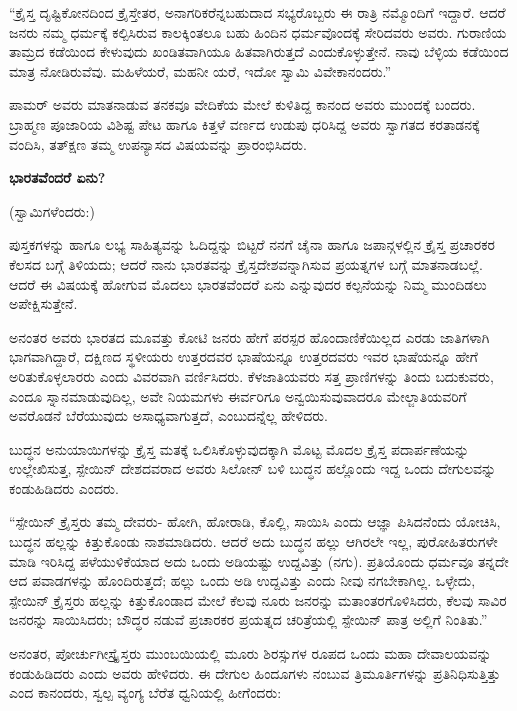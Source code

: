 “ಕ್ರೈಸ್ತ ದೃಷ್ಟಿಕೋನದಿಂದ ಕ್ರೈಸ್ತೇತರ, ಅನಾಗರಿಕರೆನ್ನಬಹುದಾದ ಸಭ್ಯರೊಬ್ಬರು ಈ ರಾತ್ರಿ ನಮ್ಮೊಂದಿಗೆ ಇದ್ದಾರೆ. ಆದರೆ ಜನರು ನಮ್ಮ ಧರ್ಮಕ್ಕೆ ಕಲ್ಪಿಸಿರುವ ಕಾಲಕ್ಕಿಂತಲೂ ಬಹು ಹಿಂದಿನ ಧರ್ಮವೊಂದಕ್ಕೆ ಸೇರಿದವರು ಅವರು. ಗುರಾಣಿಯ ತಾಮ್ರದ ಕಡೆಯಿಂದ ಕೇಳುವುದು ಖಂಡಿತವಾಗಿಯೂ ಹಿತವಾಗಿರುತ್ತದೆ ಎಂದುಕೊಳ್ಳುತ್ತೇನೆ. ನಾವು ಬೆಳ್ಳಿಯ ಕಡೆಯಿಂದ ಮಾತ್ರ ನೋಡಿರುವೆವು. ಮಹಿಳೆಯರೆ, ಮಹನೀ ಯರೆ, ಇದೋ ಸ್ವಾಮಿ ವಿವೇಕಾನಂದರು.”

ಪಾಮರ್ ಅವರು ಮಾತನಾಡುವ ತನಕವೂ ವೇದಿಕೆಯ ಮೇಲೆ ಕುಳಿತಿದ್ದ ಕಾನಂದ ಅವರು ಮುಂದಕ್ಕೆ ಬಂದರು. ಬ್ರಾಹ್ಮಣ ಪೂಜಾರಿಯ ವಿಶಿಷ್ಟ ಪೇಟ ಹಾಗೂ ಕಿತ್ತಳೆ ವರ್ಣದ ಉಡುಪು ಧರಿಸಿದ್ದ ಅವರು ಸ್ವಾಗತದ ಕರತಾಡನಕ್ಕೆ ವಂದಿಸಿ, ತತ್ಕ್ಷಣ ತಮ್ಮ ಉಪನ್ಯಾಸದ ವಿಷಯವನ್ನು ಪ್ರಾರಂಭಿಸಿದರು.

\begin{center}
\textbf{ಭಾರತವೆಂದರೆ ಏನು?}
\end{center}

(ಸ್ವಾಮಿಗಳೆಂದರು:)

ಪುಸ್ತಕಗಳನ್ನು ಹಾಗೂ ಲಭ್ಯ ಸಾಹಿತ್ಯವನ್ನು ಓದಿದ್ದನ್ನು ಬಿಟ್ಟರೆ ನನಗೆ ಚೈನಾ ಹಾಗೂ ಜಪಾನ್ಗಳಲ್ಲಿನ ಕ್ರೈಸ್ತ ಪ್ರಚಾರಕರ ಕೆಲಸದ ಬಗ್ಗೆ ತಿಳಿಯದು; ಆದರೆ ನಾನು ಭಾರತವನ್ನು ಕ್ರೈಸ್ತದೇಶವನ್ನಾಗಿಸುವ ಪ್ರಯತ್ನಗಳ ಬಗ್ಗೆ ಮಾತನಾಡಬಲ್ಲೆ. ಆದರೆ ಈ ವಿಷಯಕ್ಕೆ ಹೋಗುವ ಮೊದಲು ಭಾರತವೆಂದರೆ ಏನು ಎನ್ನುವುದರ ಕಲ್ಪನೆಯನ್ನು ನಿಮ್ಮ ಮುಂದಿಡಲು ಅಪೇಕ್ಷಿಸುತ್ತೇನೆ.

ಅನಂತರ ಅವರು ಭಾರತದ ಮೂವತ್ತು ಕೋಟಿ ಜನರು ಹೇಗೆ ಪರಸ್ಪರ ಹೊಂದಾಣಿಕೆಯಿಲ್ಲದ ಎರಡು ಜಾತಿಗಳಾಗಿ ಭಾಗವಾಗಿದ್ದಾರೆ, ದಕ್ಷಿಣದ ಸ್ಥಳೀಯರು ಉತ್ತರದವರ ಭಾಷೆಯನ್ನೂ ಉತ್ತರದವರು ಇವರ ಭಾಷೆಯನ್ನೂ ಹೇಗೆ ಅರಿತುಕೊಳ್ಳಲಾರರು ಎಂದು ವಿವರವಾಗಿ ವರ್ಣಿಸಿದರು. ಕೆಳಜಾತಿಯವರು ಸತ್ತ ಪ್ರಾಣಿಗಳನ್ನು ತಿಂದು ಬದುಕುವರು, ಎಂದೂ ಸ್ನಾನಮಾಡುವುದಿಲ್ಲ, ಅವೇ ನಿಯಮಗಳು ಈರ್ವರಿಗೂ ಅನ್ವಯಿಸುವುವಾದರೂ ಮೇಲ್ಜಾತಿಯವರಿಗೆ ಅವರೊಡನೆ ಬೆರೆಯುವುದು ಅಸಾಧ್ಯವಾಗುತ್ತದೆ, ಎಂಬುದನ್ನೆಲ್ಲ ಹೇಳಿದರು.

ಬುದ್ಧನ ಅನುಯಾಯಿಗಳನ್ನು ಕ್ರೈಸ್ತ ಮತಕ್ಕೆ ಒಲಿಸಿಕೊಳ್ಳುವುದಕ್ಕಾಗಿ ಮೊಟ್ಟ ಮೊದಲ ಕ್ರೈಸ್ತ ಪದಾರ್ಪಣೆಯನ್ನು ಉಲ್ಲೇಖಿಸುತ್ತ, ಸ್ಪೇಯಿನ್ ದೇಶದವರಾದ ಅವರು ಸಿಲೋನ್ ಬಳಿ ಬುದ್ಧನ ಹಲ್ಲೊಂದು ಇದ್ದ ಒಂದು ದೇಗುಲವನ್ನು ಕಂಡುಹಿಡಿದರು ಎಂದರು.

“ಸ್ಪೇಯಿನ್ ಕ್ರೈಸ್ತರು ತಮ್ಮ ದೇವರು- ಹೋಗಿ, ಹೋರಾಡಿ, ಕೊಲ್ಲಿ, ಸಾಯಿಸಿ ಎಂದು ಆಜ್ಞಾ ಪಿಸಿದನೆಂದು ಯೋಚಿಸಿ, ಬುದ್ಧನ ಹಲ್ಲನ್ನು ಕಿತ್ತುಕೊಂಡು ನಾಶಮಾಡಿದರು. ಆದರೆ ಅದು ಬುದ್ಧನ ಹಲ್ಲು ಆಗಿರಲೇ ಇಲ್ಲ, ಪುರೋಹಿತರುಗಳೇ ಮಾಡಿ ಇರಿಸಿದ್ದ ಪಳೆಯುಳಿಕೆಯಾದ ಅದು ಒಂದು ಅಡಿಯಷ್ಟು ಉದ್ದವಿತ್ತು (ನಗು). ಪ್ರತಿಯೊಂದು ಧರ್ಮವೂ ತನ್ನದೇ ಆದ ಪವಾಡಗಳನ್ನು ಹೊಂದಿರುತ್ತದೆ; ಹಲ್ಲು ಒಂದು ಅಡಿ ಉದ್ದವಿತ್ತು ಎಂದು ನೀವು ನಗಬೇಕಾಗಿಲ್ಲ. ಒಳ್ಳೇದು, ಸ್ಪೇಯಿನ್ ಕ್ರೈಸ್ತರು ಹಲ್ಲನ್ನು ಕಿತ್ತುಕೊಂಡಾದ ಮೇಲೆ ಕೆಲವು ನೂರು ಜನರನ್ನು ಮತಾಂತರಗೊಳಿಸಿದರು, ಕೆಲವು ಸಾವಿರ ಜನರನ್ನು ಸಾಯಿಸಿದರು; ಬೌದ್ಧರ ನಡುವೆ ಪ್ರಚಾರಕರ ಪ್ರಯತ್ನದ ಚರಿತ್ರೆಯಲ್ಲಿ ಸ್ಪೇಯಿನ್ ಪಾತ್ರ ಅಲ್ಲಿಗೆ ನಿಂತಿತು.”

ಅನಂತರ, ಪೋರ್ಚುಗೀಸ್ಕ್ರೈಸ್ತರು ಮುಂಬಯಿಯಲ್ಲಿ ಮೂರು ಶಿರಸ್ಸುಗಳ ರೂಪದ ಒಂದು ಮಹಾ ದೇವಾಲಯವನ್ನು ಕಂಡುಹಿಡಿದರು ಎಂದು ಅವರು ಹೇಳಿದರು. ಈ ದೇಗುಲ ಹಿಂದೂಗಳು ನಂಬುವ ತ್ರಿಮೂರ್ತಿಗಳನ್ನು ಪ್ರತಿನಿಧಿಸುತ್ತಿತ್ತು ಎಂದ ಕಾನಂದರು, ಸ್ವಲ್ಪ ವ್ಯಂಗ್ಯ ಬೆರೆತ ಧ್ವನಿಯಲ್ಲಿ ಹೀಗೆಂದರು:

